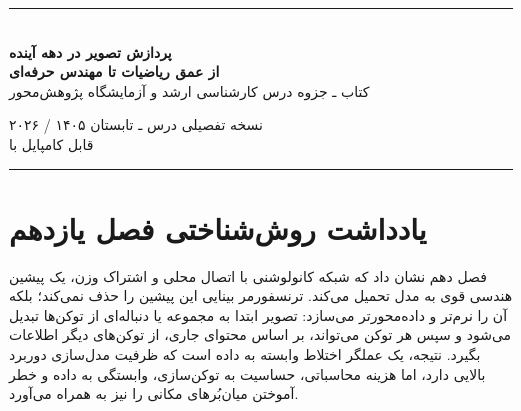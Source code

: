 \documentclass[12pt,openany,oneside]{book}
\begin{document}
\begin{titlepage}
\centering
\vspace*{0.8cm}
{\color{DeepBlue}\rule{0.9\textwidth}{1.1pt}}\\[0.9cm]
{\Huge\bfseries پردازش تصویر در دهه آینده\\[0.3cm]}
{\LARGE\bfseries از عمق ریاضیات تا مهندس حرفه‌ای\\[0.8cm]}
{\Large کتاب ـ جزوه درس کارشناسی ارشد و آزمایشگاه پژوهش‌محور\\[0.9cm]}


\vfill
{\large نسخه تفصیلی درس ـ تابستان ۱۴۰۵ / ۲۰۲۶}\\[0.4cm]
{\normalsize قابل کامپایل با }\\[0.8cm]
{\color{DeepBlue}\rule{0.9\textwidth}{1.1pt}}
\end{titlepage}

\frontmatter

\chapter*{یادداشت روش‌شناختی فصل یازدهم}
فصل دهم نشان داد که شبکه کانولوشنی با اتصال محلی و اشتراک وزن، یک پیشین هندسی قوی به مدل تحمیل می‌کند.
ترنسفورمر بینایی این پیشین را حذف نمی‌کند؛ بلکه آن را نرم‌تر و داده‌محورتر می‌سازد: تصویر ابتدا به مجموعه یا دنباله‌ای
از توکن‌ها تبدیل می‌شود و سپس هر توکن می‌تواند، بر اساس محتوای جاری، از توکن‌های دیگر اطلاعات بگیرد. نتیجه، یک
عملگر اختلاط وابسته به داده است که ظرفیت مدل‌سازی دوربرد بالایی دارد، اما هزینه محاسباتی، حساسیت به توکن‌سازی،
وابستگی به داده و خطر آموختن میان‌بُرهای مکانی را نیز به همراه می‌آورد.
\end{document}
